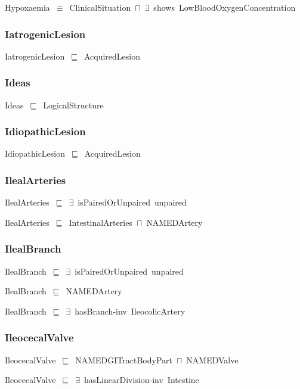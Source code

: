 \documentclass{article}
\begin{document}
Hypoxaemia~\ensuremath{\equiv}~ClinicalSituation~\ensuremath{\sqcap}~\ensuremath{\exists}~shows~LowBloodOxygenConcentration

\subsubsection*{IatrogenicLesion}

IatrogenicLesion~\ensuremath{\sqsubseteq}~AcquiredLesion~

\subsubsection*{Ideas}

Ideas~\ensuremath{\sqsubseteq}~LogicalStructure~

\subsubsection*{IdiopathicLesion}

IdiopathicLesion~\ensuremath{\sqsubseteq}~AcquiredLesion~

\subsubsection*{IlealArteries}

IlealArteries~\ensuremath{\sqsubseteq}~\ensuremath{\exists}~isPairedOrUnpaired~unpaired~

IlealArteries~\ensuremath{\sqsubseteq}~IntestinalArteries~\ensuremath{\sqcap}~NAMEDArtery~

\subsubsection*{IlealBranch}

IlealBranch~\ensuremath{\sqsubseteq}~\ensuremath{\exists}~isPairedOrUnpaired~unpaired~

IlealBranch~\ensuremath{\sqsubseteq}~NAMEDArtery~

IlealBranch~\ensuremath{\sqsubseteq}~\ensuremath{\exists}~hasBranch-inv~IleocolicArtery~

\subsubsection*{IleocecalValve}

IleocecalValve~\ensuremath{\sqsubseteq}~NAMEDGITractBodyPart~\ensuremath{\sqcap}~NAMEDValve~

IleocecalValve~\ensuremath{\sqsubseteq}~\ensuremath{\exists}~hasLinearDivision-inv~Intestine~
\end{document}
